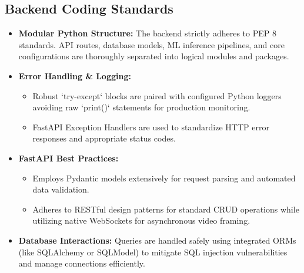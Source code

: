 \subsection{Backend Coding Standards}
\begin{itemize}[leftmargin=40pt]
    \item \textbf{Modular Python Structure:} The backend strictly adheres to PEP 8 standards. API routes, database models, ML inference pipelines, and core configurations are thoroughly separated into logical modules and packages.
    \item \textbf{Error Handling \& Logging:}
    \begin{itemize}
        \item Robust `try-except` blocks are paired with configured Python loggers avoiding raw `print()` statements for production monitoring.
        \item FastAPI Exception Handlers are used to standardize HTTP error responses and appropriate status codes.
    \end{itemize}
    \item \textbf{FastAPI Best Practices:}
    \begin{itemize}
        \item Employs Pydantic models extensively for request parsing and automated data validation.
        \item Adheres to RESTful design patterns for standard CRUD operations while utilizing native WebSockets for asynchronous video framing.
    \end{itemize}
    \item \textbf{Database Interactions:} Queries are handled safely using integrated ORMs (like SQLAlchemy or SQLModel) to mitigate SQL injection vulnerabilities and manage connections efficiently.
\end{itemize}

